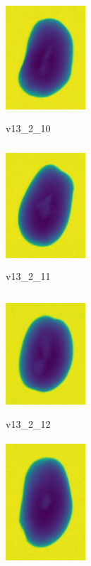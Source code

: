 \documentclass[11pt]{article}
\begin{document}
\begin{figure}
          \begin{subfigure}[b]{0.15\textwidth}
         \centering
         \includegraphics[width=3cm, height=4.5cm]{images/kartofler/v13_2_10_cut.png}
         \caption{v13\_2\_10}
         \label{fig:y equals x}
     \end{subfigure}
     \hfill
     \begin{subfigure}[b]{0.15\textwidth}
         \centering
         \includegraphics[width=3cm, height=4.5cm]{images/kartofler/v13_2_11_cut.png}
        \caption{v13\_2\_11}
         \label{fig:three sin x}
     \end{subfigure}
     \hfill
     \begin{subfigure}[b]{0.15\textwidth}
         \centering
         \includegraphics[width=3cm, height=4.5cm]{images/kartofler/v13_2_12_cut.png}
        \caption{v13\_2\_12}
         \label{fig:five over x}
     \end{subfigure}
     \hfill
    \begin{subfigure}[b]{0.15\textwidth}
         \centering
         \includegraphics[width=3cm, height=4.5cm]{images/kartofler/v13_2_13_cut.png}

\end{subfigure}
\end{figure}
\end{document}
